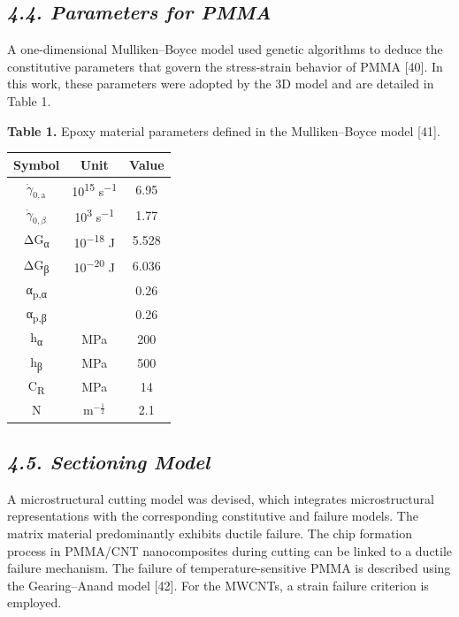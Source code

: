 \documentclass{article}
\begin{document}
\subsection*{\emph{4.4. Parameters for PMMA}}

A one-dimensional Mulliken–Boyce model used genetic algorithms to deduce the constitutive parameters that govern the stress-strain behavior of PMMA [40]. In this work, these parameters were adopted by the 3D model and are detailed in Table 1.

\noindent\textbf{Table 1.} Epoxy material parameters defined in the Mulliken–Boyce model [41].
\begin{center}
\begin{tabular}{ccc}
\toprule
\textbf{Symbol} & \textbf{Unit} & \textbf{Value}\\
\midrule
$\dot{\gamma}_{0,\mathrm{a}}$ & 10\textsuperscript{15} s\textsuperscript{−1} & 6.95\\
$\dot{\gamma}_{0,\beta}$ & 10\textsuperscript{3} s\textsuperscript{−1} & 1.77\\
ΔG\textsubscript{α} & 10\textsuperscript{−18} J & 5.528\\
ΔG\textsubscript{β} & 10\textsuperscript{−20} J & 6.036\\
α\textsubscript{p,α} & & 0.26\\
α\textsubscript{p,β} & & 0.26\\
h\textsubscript{α} & MPa & 200\\
h\textsubscript{β} & MPa & 500\\
C\textsubscript{R} & MPa & 14\\
N & m$^{-\frac{1}{2}}$ & 2.1\\
\bottomrule
\end{tabular}
\end{center}

\subsection*{\emph{4.5. Sectioning Model}}

A microstructural cutting model was devised, which integrates microstructural representations with the corresponding constitutive and failure models. The matrix material predominantly exhibits ductile failure. The chip formation process in PMMA/CNT nanocomposites during cutting can be linked to a ductile failure mechanism. The failure of temperature-sensitive PMMA is described using the Gearing–Anand model [42]. For the MWCNTs, a strain failure criterion is employed.
\end{document}
